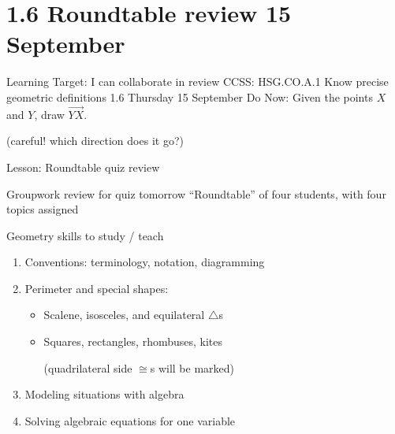 \section{1.6 Roundtable review \hfill 15 September}
\begin{frame}{Learning Target: I can collaborate in review}
  {CCSS: HSG.CO.A.1 Know precise geometric definitions  \hfill \alert{1.6 Thursday 15 September}}
  Do Now: Given the points $X$ and $Y$, draw $\overrightarrow{YX}$. \par \bigskip
  (careful! which direction does it go?) 
  \vspace{1cm}
  \begin{center}
  \end{center} \vspace{1cm}
  Lesson: Roundtable quiz review
\end{frame}

\begin{frame}{Groupwork review for \alert{quiz tomorrow}}
  {``Roundtable'' of four students, with four topics assigned}
  \begin{block}{Geometry skills to study / teach}
      \begin{enumerate}
    \item Conventions: terminology, notation, diagramming
    \item Perimeter and special shapes: 
    \begin{itemize}
      \item Scalene, isosceles, and equilateral $\triangle$s
      \item Squares, rectangles, rhombuses, kites \par 
      (quadrilateral side $\cong$s will be marked)
    \end{itemize}
    \item Modeling situations with algebra
    \item Solving algebraic equations for one variable
  \end{enumerate}
  \end{block}
\end{frame}

